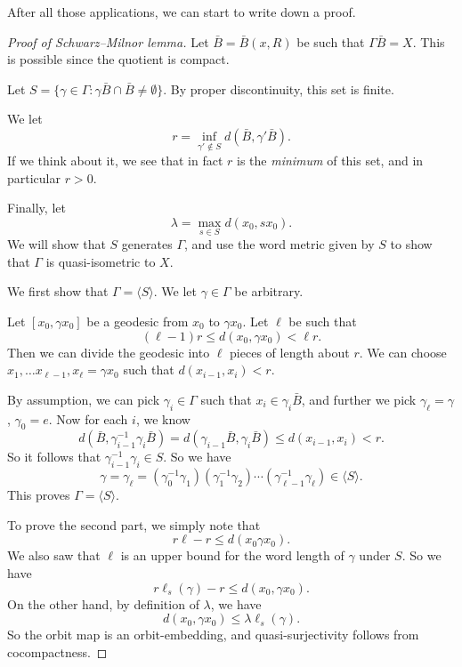 \documentclass[a4paper]{article}
\begin{document}
After all those applications, we can start to write down a proof.
\begin{proof}[Proof of Schwarz--Milnor lemma]
  Let $\bar{B} = \bar{B}(x, R)$ be such that $\Gamma \bar{B} = X$. This is possible since the quotient is compact.

  Let $S = \{\gamma \in \Gamma: \gamma \bar{B} \cap \bar{B} \not=\emptyset\}$. By proper discontinuity, this set is finite.

  We let
  \[
    r = \inf_{\gamma' \not \in S} d(\bar{B}, \gamma' \bar{B}).
  \]
  If we think about it, we see that in fact $r$ is the \emph{minimum} of this set, and in particular $r > 0$.

  Finally, let
  \[
    \lambda = \max_{s \in S} d(x_0, s x_0).
  \]
  We will show that $S$ generates $\Gamma$, and use the word metric given by $S$ to show that $\Gamma$ is quasi-isometric to $X$.

  We first show that $\Gamma = \langle S\rangle$. We let $\gamma \in \Gamma$ be arbitrary.

  Let $[x_0, \gamma x_0]$ be a geodesic from $x_0$ to $\gamma x_0$. Let $\ell$ be such that
  \[
    (\ell - 1)r \leq d(x_0, \gamma x_0) < \ell r.
  \]
  Then we can divide the geodesic into $\ell$ pieces of length about $r$. We can choose $x_1, \ldots x_{\ell - 1}, x_\ell = \gamma x_0$ such that $d(x_{i - 1}, x_i) < r$.

  By assumption, we can pick $\gamma_i \in \Gamma$ such that $x_i \in \gamma_i \bar{B}$, and further we pick $\gamma_\ell = \gamma$, $\gamma_0 = e$. Now for each $i$, we know
  \[
    d(\bar{B}, \gamma_{i -1 }^{-1} \gamma_i \bar{B}) = d(\gamma_{i - 1} \bar{B}, \gamma_i \bar{B}) \leq d(x_{i - 1}, x_i) < r.
  \]
  So it follows that $\gamma_{i - 1}^{-1} \gamma_i \in S$. So we have
  \[
    \gamma = \gamma_\ell = (\gamma_0^{-1} \gamma_1) (\gamma_1^{-1}\gamma_2) \cdots (\gamma_{\ell - 1}^{-1}\gamma_\ell) \in \langle S\rangle.
  \]
  This proves $\Gamma = \langle S \rangle$.

  To prove the second part, we simply note that
  \[
    r\ell - r \leq d (x_0 \gamma x_0).
  \]
  We also saw that $\ell$ is an upper bound for the word length of $\gamma$ under $S$. So we have
  \[
    r \ell_s(\gamma) - r \leq d(x_0, \gamma x_0).
  \]
  On the other hand, by definition of $\lambda$, we have
  \[
    d(x_0, \gamma x_0) \leq \lambda \ell_s(\gamma).
  \]
  So the orbit map is an orbit-embedding, and quasi-surjectivity follows from cocompactness.
\end{proof}
\end{document}
